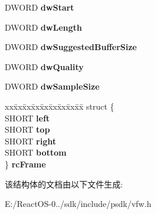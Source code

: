 \begin{DoxyCompactItemize}
D\+W\+O\+RD {\bfseries dw\+Start}
\item 
\mbox{\label{struct_a_v_i_stream_header_ab7534fa6500b79c5c46d066d48e223a2}} 
D\+W\+O\+RD {\bfseries dw\+Length}
\item 
\mbox{\label{struct_a_v_i_stream_header_ab947efb21171e7a6a01ff68e564b9f50}} 
D\+W\+O\+RD {\bfseries dw\+Suggested\+Buffer\+Size}
\item 
\mbox{\label{struct_a_v_i_stream_header_a21a7aee9402870452d4ec697c5085e2b}} 
D\+W\+O\+RD {\bfseries dw\+Quality}
\item 
\mbox{\label{struct_a_v_i_stream_header_a3e634b1d9ed990cc36618dfc8c040835}} 
D\+W\+O\+RD {\bfseries dw\+Sample\+Size}
\item 
\mbox{\label{struct_a_v_i_stream_header_a8f63c548213489c3a88a6af801ef1dee}} 
\begin{tabbing}
xx\=xx\=xx\=xx\=xx\=xx\=xx\=xx\=xx\=\kill
struct \{\\
\>SHORT {\bfseries left}\\
\>SHORT {\bfseries top}\\
\>SHORT {\bfseries right}\\
\>SHORT {\bfseries bottom}\\
\} {\bfseries rcFrame}\\

\end{tabbing}\end{DoxyCompactItemize}


该结构体的文档由以下文件生成\+:\begin{DoxyCompactItemize}
\item 
E\+:/\+React\+O\+S-\/0../sdk/include/psdk/vfw.\+h\end{DoxyCompactItemize}
